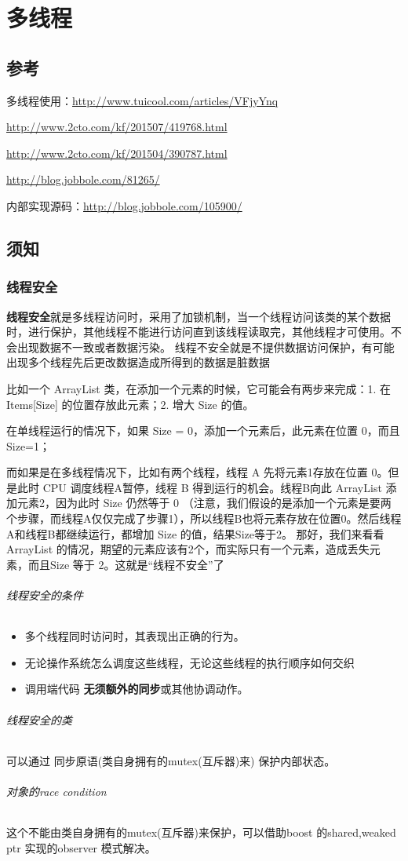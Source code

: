 \documentclass[UTF8,a4paper,12pt]{ctexbook}
\begin{document}
\chapter{多线程}
\section{参考}
	多线程使用：\url{http://www.tuicool.com/articles/VFjyYnq}
		
		\url{http://www.2cto.com/kf/201507/419768.html}
		
		\url{http://www.2cto.com/kf/201504/390787.html}
		
		\url{http://blog.jobbole.com/81265/}
	
	内部实现源码：\url{http://blog.jobbole.com/105900/}
	
\section{须知}
	\subsection{线程安全}
		\textbf{线程安全}就是多线程访问时，采用了加锁机制，当一个线程访问该类的某个数据时，进行保护，其他线程不能进行访问直到该线程读取完，其他线程才可使用。不会出现数据不一致或者数据污染。 线程不安全就是不提供数据访问保护，有可能出现多个线程先后更改数据造成所得到的数据是脏数据
		
		比如一个 ArrayList 类，在添加一个元素的时候，它可能会有两步来完成：1. 在 Items[Size] 的位置存放此元素；2. 增大 Size 的值。
		
		在单线程运行的情况下，如果 Size = 0，添加一个元素后，此元素在位置 0，而且 Size=1；
		
		而如果是在多线程情况下，比如有两个线程，线程 A 先将元素1存放在位置 0。但是此时 CPU 调度线程A暂停，线程 B 得到运行的机会。线程B向此 ArrayList 添加元素2，因为此时 Size 仍然等于 0 （注意，我们假设的是添加一个元素是要两个步骤，而线程A仅仅完成了步骤1），所以线程B也将元素存放在位置0。然后线程A和线程B都继续运行，都增加 Size 的值，结果Size等于2。
		那好，我们来看看 ArrayList 的情况，期望的元素应该有2个，而实际只有一个元素，造成丢失元素，而且Size 等于 2。这就是“线程不安全”了
		\subparagraph{线程安全的条件}
			\begin{itemize}
				\item 多个线程同时访问时，其表现出正确的行为。
				\item 无论操作系统怎么调度这些线程，无论这些线程的执行顺序如何交织
				\item 调用端代码 \textbf{无须额外的同步}或其他协调动作。
			\end{itemize}
		\subparagraph{线程安全的类}可以通过 同步原语(类自身拥有的mutex(互斥器)来) 保护内部状态。
		\subparagraph{对象的race condition}这个不能由类自身拥有的mutex(互斥器)来保护，可以借助boost 的shared,weaked ptr 实现的observer 模式解决。
		
\end{document}
